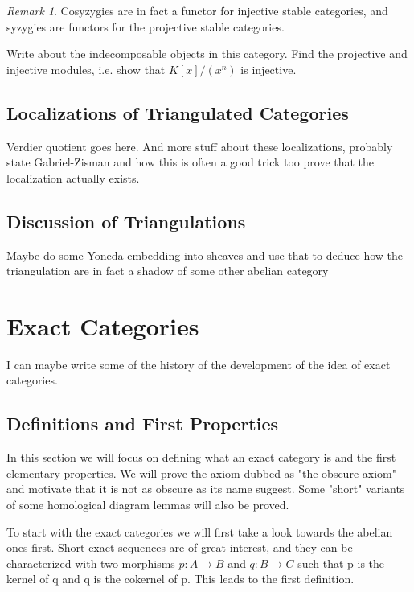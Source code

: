 \documentclass[12pt]{article}
\theoremstyle{definition}
\theoremstyle{remark}
\newtheorem*{remark}{Remark}
\begin{document}
            \begin{remark}
                Cosyzygies are in fact a functor for injective stable categories, and syzygies are functors for the projective stable categories.
            \end{remark}

            Write about the indecomposable objects in this category. Find the projective and injective modules, i.e. show that $K[x]/(x^n)$ is injective.

        \subsection{Localizations of Triangulated Categories}
            Verdier quotient goes here. And more stuff about these localizations, probably state Gabriel-Zisman and how this is often a good trick too prove that the localization actually exists.

        \subsection{Discussion of Triangulations}
            Maybe do some Yoneda-embedding into sheaves and use that to deduce how the triangulation are in fact a shadow of some other abelian category
    
    \clearpage
    
    \section{Exact Categories}
            
        I can maybe write some of the history of the development of the idea of exact categories. 

        \subsection{Definitions and First Properties}

            In this section we will focus on defining what an exact category is and the first elementary properties. We will prove the axiom dubbed as "the obscure axiom" and motivate that it is not as obscure as its name suggest. Some "short" variants of some homological diagram lemmas will also be proved.

            To start with the exact categories we will first take a look towards the abelian ones first. Short exact sequences are of great interest, and they can be characterized with two morphisms $p:A\rightarrow B$ and $q:B\rightarrow C$ such that p is the kernel of q and q is the cokernel of p. This leads to the first definition.
\end{document}

